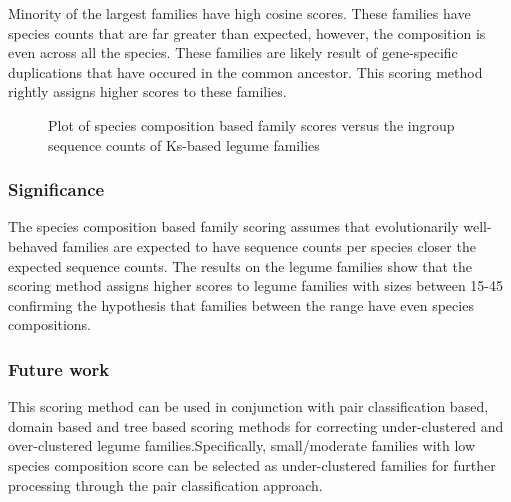 \documentclass{article}
\begin{document}
		Minority of the largest families have high cosine scores.  These families have species counts that are far greater than expected, however, the composition is even across all the species. These families are likely result of gene-specific duplications that have occured in the common ancestor. This scoring method rightly assigns higher scores to these families.
		
		\begin{figure}[h!]
			\caption{Plot of species composition based family scores versus the ingroup sequence counts of Ks-based legume families}
			\label{fig:scatter_famsize_vs_species_comp_cosine_score}
		\end{figure}
		
		\subsubsection{Significance}
		The species composition based family scoring assumes that evolutionarily well-behaved families are expected to have sequence counts per species closer the expected sequence counts. The results on the legume families show that the scoring method assigns higher scores to legume families with sizes between 15-45 confirming the hypothesis that families between the range have even species compositions.
	
		\subsubsection{Future work}
		This scoring method can be used in conjunction with pair classification based, domain based and tree based scoring methods for correcting under-clustered and over-clustered legume families.Specifically, small/moderate families with low species composition score can be selected as under-clustered families for further processing through the pair classification approach.
		
\end{document}
